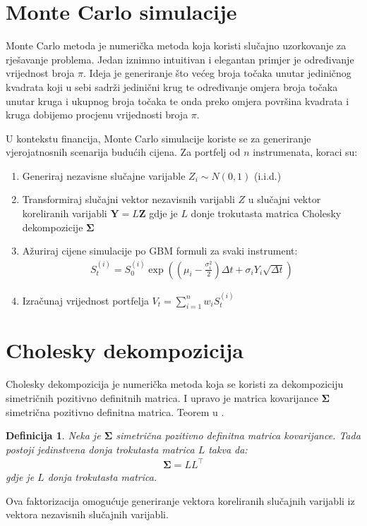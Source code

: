 \documentclass[zavrsnirad]{fer}
\newtheorem{definition}{Definicija}
\begin{document}
\section{Monte Carlo simulacije}
\label{sek:monte_carlo}
Monte Carlo metoda je numerička metoda koja koristi slučajno
uzorkovanje za rješavanje problema.
Jedan iznimno intuitivan i elegantan primjer je određivanje
vrijednost broja $\pi$.
Ideja je generiranje što većeg broja točaka unutar jediničnog
kvadrata koji u sebi sadrži jedinični krug te određivanje
omjera broja točaka unutar kruga i ukupnog broja točaka te onda
preko omjera površina kvadrata i kruga dobijemo procjenu vrijednosti
broja $\pi$.

U kontekstu financija, Monte Carlo simulacije koriste se za
generiranje vjerojatnosnih scenarija budućih cijena.
Za portfelj od $n$ instrumenata, koraci su:
\begin{enumerate}
    \item Generiraj nezavisne slučajne varijable $Z_i \sim N(0,1)$ (i.i.d.)
\item Transformiraj slučajni vektor nezavisnih varijabli $Z$ u
    slučajni vektor koreliranih varijabli $\mathbf{Y} = L\mathbf{Z}$
    gdje je $L$ donje trokutasta matrica Cholesky
        dekompozicije $\boldsymbol{\Sigma}$
\item Ažuriraj cijene simulacije po GBM formuli za svaki instrument:
\begin{align*}
S_t^{(i)} = S_0^{(i)} \exp\left(\left(\mu_i - \frac{\sigma_i^2}{2}\right)\Delta t + \sigma_i Y_i \sqrt{\Delta t}\right)
\end{align*}
\item Izračunaj vrijednost portfelja $V_t = \sum_{i=1}^n w_i S_t^{(i)}$
\end{enumerate}

\section{Cholesky dekompozicija}
\label{sek:cholesky}
Cholesky dekompozicija je numerička metoda koja se koristi za
dekompoziciju simetričnih pozitivno definitnih matrica. I upravo
je matrica kovarijance $\boldsymbol{\Sigma}$ simetrična pozitivno
definitna matrica. Teorem u \cite{NumerickaMatematika}.
\begin{definition}
    \label{def:cholesky}
    Neka je $\boldsymbol{\Sigma}$ simetrična pozitivno definitna
    matrica kovarijance. Tada postoji jedinstvena donja trokutasta
    matrica $L$ takva da:
    \begin{align*}
        \boldsymbol{\Sigma} = LL^\intercal
    \end{align*}
    \indent gdje je $L$ donja trokutasta matrica.
\end{definition}
Ova faktorizacija omogućuje generiranje vektora koreliranih slučajnih varijabli
iz vektora nezavisnih slučajnih varijabli.
\end{document}
